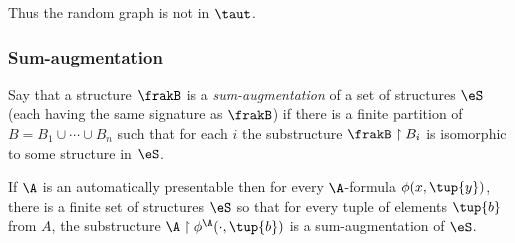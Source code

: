 Thus the random graph is not in $\taut$.

\subsubsection*{Sum-augmentation}

\begin{definition}
Say that a structure $\frakB$ is a {\em sum-augmentation} of a set of structures
$\eS$ (each having the same signature as $\frakB$) if there is a finite partition of $B
= B_1 \cup \cdots \cup B_n$ such that for each $i$ the substructure $\frakB
\restriction B_i$ is isomorphic to some structure in $\eS$.
\end{definition}

\begin{theorem} \label{thm:sumaug}
If $\A$ is an automatically presentable
then for every $\A$-formula $\phi(x,\tup{y})$, there is a finite set of
structures $\eS$ so that for every tuple of elements $\tup{b}$ from $A$, the
substructure $\A \restriction \phi^{\A}(\cdot,\tup{b})$ is a sum-augmentation
of $\eS$.
\end{theorem}


